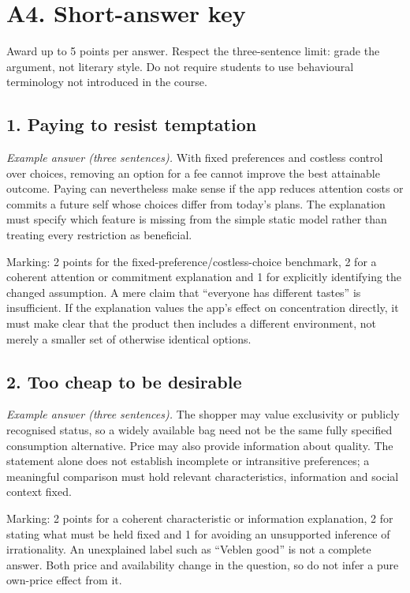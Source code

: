 \section*{A4. Short-answer key}
Award up to 5 points per answer. Respect the three-sentence limit: grade the argument, not literary style. Do not require students to use behavioural terminology not introduced in the course.
\subsection*{1. Paying to resist temptation}
\emph{Example answer (three sentences).} With fixed preferences and costless control over choices, removing an option for a fee cannot improve the best attainable outcome. Paying can nevertheless make sense if the app reduces attention costs or commits a future self whose choices differ from today's plans. The explanation must specify which feature is missing from the simple static model rather than treating every restriction as beneficial.

Marking: 2 points for the fixed-preference/costless-choice benchmark, 2 for a coherent attention or commitment explanation and 1 for explicitly identifying the changed assumption. A mere claim that ``everyone has different tastes'' is insufficient. If the explanation values the app's effect on concentration directly, it must make clear that the product then includes a different environment, not merely a smaller set of otherwise identical options.
\subsection*{2. Too cheap to be desirable}
\emph{Example answer (three sentences).} The shopper may value exclusivity or publicly recognised status, so a widely available bag need not be the same fully specified consumption alternative. Price may also provide information about quality. The statement alone does not establish incomplete or intransitive preferences; a meaningful comparison must hold relevant characteristics, information and social context fixed.

Marking: 2 points for a coherent characteristic or information explanation, 2 for stating what must be held fixed and 1 for avoiding an unsupported inference of irrationality. An unexplained label such as ``Veblen good'' is not a complete answer. Both price and availability change in the question, so do not infer a pure own-price effect from it.
